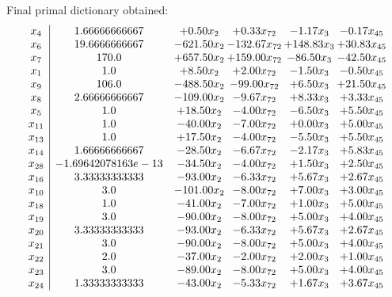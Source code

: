 \documentclass[8pt]{article}
\begin{document}
 Final primal dictionary obtained: 
\[\begin{array}{c| c c@{\hskip 2pt} c@{\hskip 2pt} c@{\hskip 2pt} c@{\hskip 2pt} }
 x_{4}   &  1.66666666667 & +  0.50 x_{2} & +  0.33 x_{72} & -1.17 x_{3} & -0.17 x_{45}\\
 x_{6}   &  19.6666666667 & -621.50 x_{2} & -132.67 x_{72} & + 148.83 x_{3} & + 30.83 x_{45}\\
 x_{7}   &  170.0 & + 657.50 x_{2} & + 159.00 x_{72} & -86.50 x_{3} & -42.50 x_{45}\\
 x_{1}   &  1.0 & +  8.50 x_{2} & +  2.00 x_{72} & -1.50 x_{3} & -0.50 x_{45}\\
 x_{9}   &  106.0 & -488.50 x_{2} & -99.00 x_{72} & +  6.50 x_{3} & + 21.50 x_{45}\\
 x_{8}   &  2.66666666667 & -109.00 x_{2} & -9.67 x_{72} & +  8.33 x_{3} & +  3.33 x_{45}\\
 x_{5}   &  1.0 & + 18.50 x_{2} & -4.00 x_{72} & -6.50 x_{3} & +  5.50 x_{45}\\
 x_{11}   &  1.0 & -40.00 x_{2} & -7.00 x_{72} & +  0.00 x_{3} & +  5.00 x_{45}\\
 x_{13}   &  1.0 & + 17.50 x_{2} & -4.00 x_{72} & -5.50 x_{3} & +  5.50 x_{45}\\
 x_{14}   &  1.66666666667 & -28.50 x_{2} & -6.67 x_{72} & -2.17 x_{3} & +  5.83 x_{45}\\
 x_{28}   &  -1.69642078163e-13 & -34.50 x_{2} & -4.00 x_{72} & +  1.50 x_{3} & +  2.50 x_{45}\\
 x_{16}   &  3.33333333333 & -93.00 x_{2} & -6.33 x_{72} & +  5.67 x_{3} & +  2.67 x_{45}\\
 x_{10}   &  3.0 & -101.00 x_{2} & -8.00 x_{72} & +  7.00 x_{3} & +  3.00 x_{45}\\
 x_{18}   &  1.0 & -41.00 x_{2} & -7.00 x_{72} & +  1.00 x_{3} & +  5.00 x_{45}\\
 x_{19}   &  3.0 & -90.00 x_{2} & -8.00 x_{72} & +  5.00 x_{3} & +  4.00 x_{45}\\
 x_{20}   &  3.33333333333 & -93.00 x_{2} & -6.33 x_{72} & +  5.67 x_{3} & +  2.67 x_{45}\\
 x_{21}   &  3.0 & -90.00 x_{2} & -8.00 x_{72} & +  5.00 x_{3} & +  4.00 x_{45}\\
 x_{22}   &  2.0 & -37.00 x_{2} & -2.00 x_{72} & +  2.00 x_{3} & +  1.00 x_{45}\\
 x_{23}   &  3.0 & -89.00 x_{2} & -8.00 x_{72} & +  5.00 x_{3} & +  4.00 x_{45}\\
 x_{24}   &  1.33333333333 & -43.00 x_{2} & -5.33 x_{72} & +  1.67 x_{3} & +  3.67 x_{45}\\

\end{array}\]
\end{document}
